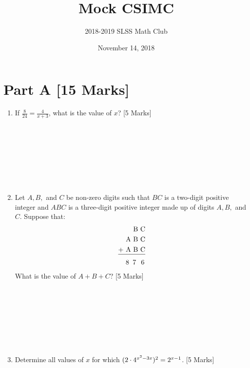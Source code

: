 \documentclass[12pt]{article}
\title{Mock CSIMC\vspace{-3mm}}
\author{2018-2019 SLSS Math Club\vspace{-5mm}}
\date{November 14, 2018\vspace{-5mm}}
\begin{document}
\maketitle

\newcommand{\aSpace}{\\ \\ \\ \\ \\ \\ \\ \\}
\section*{Part A [15 Marks]}
\begin{enumerate}
    \item If $\displaystyle{\frac{8}{24} = \frac{4}{x + 3}}$, what is the value of $x$? [5 Marks] \aSpace
    \item Let $A, B,$ and $C$ be non-zero digits such that $BC$ is a two-digit positive integer and $ABC$ is a three-digit positive integer made up of digits $A, B,$ and $C$. Suppose that:
    \begin{align*}
        \text{B }&\text{C}  \\
        \text{A B }&\text{C}  \\
        \text{+ A B }&\text{C} \\[-11pt]
        \cline{1-2}
        \text{8 \hspace{-0.5mm} 7 \hspace{1mm}}&\text{\hspace{-0.8mm} 6}
    \end{align*}
    What is the value of $A + B + C$? [5 Marks] \aSpace
    \item Determine all values of $x$ for which $\Large(2\cdot 4^{x^2 - 3x}\Large)^2 = 2^{x - 1}$. [5 Marks] \aSpace
\end{enumerate}
\end{document}
